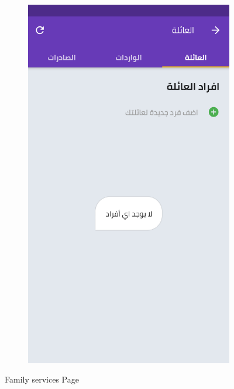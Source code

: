 \begin{figure}[H]
\begin{subfigure}[b]{0.5\linewidth}
  \end{subfigure}%
    \begin{subfigure}[b]{0.5\linewidth}
    \centering
    \includegraphics[width=0.5\linewidth]{images/ch3/family/10.png}
  
  \end{subfigure}%
    \caption{ Family services Page}

  \end{figure}
  
